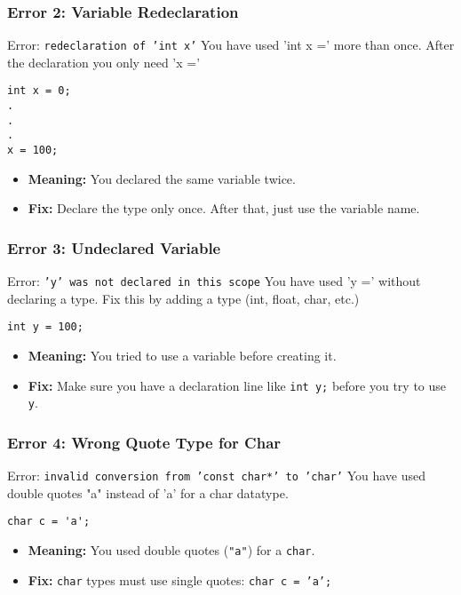 \documentclass{beamer}
\begin{document}
\begin{frame}[fragile]
\frametitle{Error 2: Variable Redeclaration}
\begin{alertblock}{Error: \texttt{redeclaration of 'int x'}}
You have used 'int x =' more than once. After the declaration you only need 'x ='
\end{alertblock}
\begin{verbatim}
int x = 0;
.
.
.
x = 100;
\end{verbatim}
\begin{itemize}
    \item \textbf{Meaning:} You declared the same variable twice.
    \item \textbf{Fix:} Declare the type only once. After that, just use the variable name.
\end{itemize}
\end{frame}

\begin{frame}[fragile]
\frametitle{Error 3: Undeclared Variable}
\begin{alertblock}{Error: \texttt{'y' was not declared in this scope}}
You have used 'y =' without declaring a type. Fix this by adding a type (int, float, char, etc.)
\end{alertblock}
\begin{verbatim}
int y = 100;
\end{verbatim}
\begin{itemize}
    \item \textbf{Meaning:} You tried to use a variable before creating it.
    \item \textbf{Fix:} Make sure you have a declaration line like \texttt{int y;} before you try to use \texttt{y}.
\end{itemize}
\end{frame}

\begin{frame}[fragile]
\frametitle{Error 4: Wrong Quote Type for Char}
\begin{alertblock}{Error: \texttt{invalid conversion from 'const char*' to 'char'}}
You have used double quotes "a" instead of 'a' for a char datatype.
\end{alertblock}
\begin{verbatim}
char c = 'a';
\end{verbatim}
\begin{itemize}
    \item \textbf{Meaning:} You used double quotes (\texttt{"a"}) for a \texttt{char}.
    \item \textbf{Fix:} \texttt{char} types must use single quotes: \texttt{char c = 'a';}
\end{itemize}
\end{frame}
\end{document}

